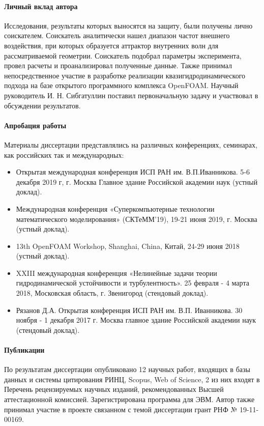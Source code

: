 \documentclass[utf8x]{G7-32} %
\begin{document}
\paragraph{Личный вклад автора}

Исследования, результаты которых выносятся на защиту, были получены лично соискателем. Соискатель аналитически нашел диапазон частот внешнего воздействия, при которых образуется аттрактор внутренних волн для рассматриваемой геометрии. Соискатель подобрал параметры эксперимента, провел расчеты и проанализировал полученные данные. Также принимал непосредственное участие в разработке реализации квазигидродинамического подхода на базе открытого программного комплекса OpenFOAM. Научный руководитель И. Н. Сибгатуллин поставил первоначальную задачу и участвовал в обсуждении результатов. 

\paragraph{Апробация работы}

Материалы диссертации представлялись на различных конференциях, семинарах, как российских так и международных:


\begin{itemize}
  \item Открытая международная конференция ИСП РАН им. В.П.Иванникова. 5-6 декабря 2019 г, г. Москва Главное здание Российской академии наук (устный доклад).
  \item Международная конференция «Суперкомпьютерные технологии математического моделирования» (СКТеММ’19), 19-21 июня 2019, г. Москва (устный доклад).
  \item 13th OpenFOAM Workshop, Shanghai, China, Китай, 24-29 июня 2018 (устный доклад).
  \item XXIII международная конференция «Нелинейные задачи теории гидродинамической устойчивости и турбулентность». 25 февраля - 4 марта 2018, Московская область, г. Звенигород (стендовый доклад).
  \item Рязанов Д.А. Открытая конференция ИСП РАН им. В.П. Иванникова. 30 ноября - 1 декабря 2017 г. Москва главное здание Российской академии наук (стендовый доклад).
\end{itemize}

\paragraph{Публикации}

По результатам диссертации опубликовано 12 научных работ, входящих в базы данных и системы цитирования РИНЦ, Scopus, Web of Science, 2 из них входят в Перечень рецензируемых научных изданий, рекомендованных Высшей аттестационной комиссией. Зарегистрирована программа для ЭВМ. Автор также принимал участие в проекте связанном с темой диссертации грант РНФ № 19-11-00169.
\end{document}
